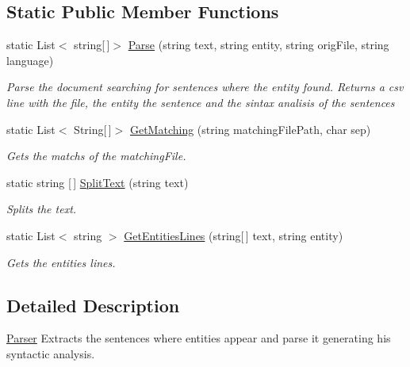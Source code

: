 \subsection*{Static Public Member Functions}
\begin{DoxyCompactItemize}
\item 
static List$<$ string\mbox{[}$\,$\mbox{]}$>$ \hyperlink{class_a_t_p_r_parser_1_1_parser_a4d0782c4136575c1b9a33102be225ea1}{Parse} (string text, string entity, string orig\+File, string language)
\begin{DoxyCompactList}\small\item\em Parse the document searching for sentences where the entity found. Returns a csv line with the file, the entity the sentence and the sintax analisis of the sentences \end{DoxyCompactList}\item 
static List$<$ String\mbox{[}$\,$\mbox{]}$>$ \hyperlink{class_a_t_p_r_parser_1_1_parser_a853c07acd90bab8533ae613fd05f3057}{Get\+Matching} (string matching\+File\+Path, char sep)
\begin{DoxyCompactList}\small\item\em Gets the matchs of the matching\+File. \end{DoxyCompactList}\item 
static string \mbox{[}$\,$\mbox{]} \hyperlink{class_a_t_p_r_parser_1_1_parser_adb6ac564b6ddc976a82a46d66f91bb54}{Split\+Text} (string text)
\begin{DoxyCompactList}\small\item\em Splits the text. \end{DoxyCompactList}\item 
static List$<$ string $>$ \hyperlink{class_a_t_p_r_parser_1_1_parser_ae5268f6e00d7c5a30a7cb8f463892772}{Get\+Entities\+Lines} (string\mbox{[}$\,$\mbox{]} text, string entity)
\begin{DoxyCompactList}\small\item\em Gets the entities lines. \end{DoxyCompactList}\end{DoxyCompactItemize}


\subsection{Detailed Description}
\hyperlink{class_a_t_p_r_parser_1_1_parser}{Parser} Extracts the sentences where entities appear and parse it generating his syntactic analysis. 



